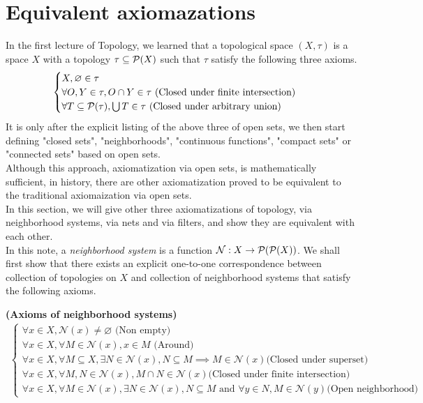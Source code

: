 \documentclass{report}
\begin{document}
\section{Equivalent axiomazations}
\begin{mdframed}
In the first lecture of Topology, we learned that a topological space $(X,\tau)$ is a space $X$ with a topology  $\tau \subseteq \mathcal{P}(X)$ such that $\tau$ satisfy the following three axioms.
\begin{align}
\label{1.1}
\begin{cases}
X,\varnothing \in \tau\\
\forall O,Y \in \tau, O \cap Y \in \tau\text{ (Closed under finite intersection) }\\
\forall T \subseteq \mathcal{P}(\tau), \bigcup T \in \tau\text{ (Closed under arbitrary union) }
\end{cases}
\end{align}
It is only after the explicit listing of the above three of open sets, we then start defining "closed sets", "neighborhoods", "continuous functions", "compact sets" or "connected sets" based on open sets.\\

Although this approach, axiomatization via open sets, is mathematically sufficient, in history, there are other axiomatization proved to be equivalent to the traditional axiomaization via open sets.\\

In this section, we will give other three axiomatizations of topology, via neighborhood systems, via nets and via filters, and show they are equivalent with each other.\\

In this note, a \textit{neighborhood system} is a function $\mathcal{N}:X\rightarrow \mathcal{P}(\mathcal{P}(X))$. We shall first show that there exists an explicit one-to-one correspondence between collection of topologies on $X$ and collection of neighborhood systems that satisfy the following axioms.  
\end{mdframed}
\begin{axiom}
\label{1.1.1}
\textbf{(Axioms of neighborhood systems)} 
\begin{align*}
\begin{cases}
\forall x\in X, \mathcal{N}(x)\neq \varnothing \text{ (Non empty) }\\
\forall x\in X, \forall M \in \mathcal{N}(x), x \in M\text{ (Around) }\\
\forall x \in X, \forall M\subseteq X, \exists N \in \mathcal{N}(x), N\subseteq M \implies M \in \mathcal{N}(x)\text{(Closed under superset)}\\
\forall x \in X, \forall M,N \in \mathcal{N}(x), M \cap  N \in \mathcal{N}(x)\text{(Closed under finite intersection)}\\
\forall x \in X, \forall M\in \mathcal{N}(x), \exists N \in \mathcal{N}(x), N \subseteq M \text{ and } \forall y \in N, M \in \mathcal{N}(y)\text{(Open neighborhood)}
\end{cases}
\end{align*}
\end{axiom}
\end{document}
